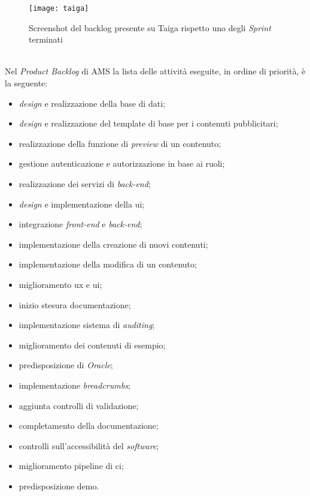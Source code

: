 \begin{figure}[h]
    \begin{center}
    \texttt{[image: taiga]}
    \caption{Screenshot del backlog presente su Taiga rispetto uno degli \textit{Sprint} terminati}
    \label{fig:figure14}
    \end{center}
\end{figure}
\\Nel \textit{Product Backlog} di AMS la lista delle attività eseguite, in ordine di priorità, è la seguente:
\begin{itemize}
    \item \textit{design} e realizzazione della base di dati;
    \item \textit{design} e realizzazione del template di base per i contenuti pubblicitari;
    \item realizzazione della funzione di \textit{preview} di un contenuto;   
    \item gestione autenticazione e autorizzazione in base ai ruoli;
    \item realizzazione dei servizi di \textit{back-end}; 
    \item \textit{design} e implementazione della \gls{ui}\glsfirstoccur{};
    \item integrazione \textit{front-end} e \textit{back-end};
    \item implementazione della creazione di nuovi contenuti;
    \item implementazione della modifica di un contenuto;
    \item miglioramento \gls{ux}\glsfirstoccur{} e \gls{ui};
    \item inizio stesura documentazione;
    \item implementazione sistema di \textit{auditing};
    \item miglioramento dei contenuti di esempio;
    \item predisposizione di \textit{Oracle};
    \item implementazione \textit{breadcrumbs};
    \item aggiunta controlli di validazione;
    \item completamento della documentazione;
    \item controlli sull'accessibilità del \textit{software};
    \item miglioramento pipeline di \gls{ci}\glsfirstoccur{};
    \item predisposizione demo.
\end{itemize}

